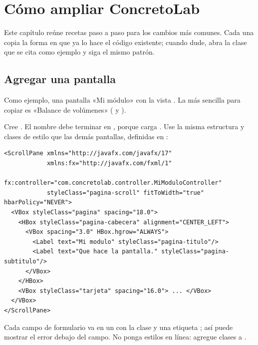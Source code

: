 \section{Cómo ampliar ConcretoLab}
\label{sec:amp-ampliar}

Este capítulo reúne recetas paso a paso para los cambios más comunes. Cada una copia la forma en que ya lo hace el
código existente; cuando dude, abra la clase que se cita como ejemplo y siga el mismo patrón.

\subsection{Agregar una pantalla}
\label{sec:amp-pantalla}

Como ejemplo, una pantalla «Mi módulo» con la vista . La más sencilla para copiar es
«Balance de volúmenes» ( y ).

\par\medskip\noindent{}\hspace{0.5em}{\bfseries Crear la vista FXML}\par\nopagebreak\smallskip

Cree . El nombre debe terminar en , porque
 carga . Use la misma estructura y clases de estilo que las demás
pantallas, definidas en :

\begin{verbatim}
<ScrollPane xmlns="http://javafx.com/javafx/17"
            xmlns:fx="http://javafx.com/fxml/1"
            fx:controller="com.concretolab.controller.MiModuloController"
            styleClass="pagina-scroll" fitToWidth="true" hbarPolicy="NEVER">
  <VBox styleClass="pagina" spacing="18.0">
    <HBox styleClass="pagina-cabecera" alignment="CENTER_LEFT">
      <VBox spacing="3.0" HBox.hgrow="ALWAYS">
        <Label text="Mi modulo" styleClass="pagina-titulo"/>
        <Label text="Que hace la pantalla." styleClass="pagina-subtitulo"/>
      </VBox>
    </HBox>
    <VBox styleClass="tarjeta" spacing="16.0"> ... </VBox>
  </VBox>
</ScrollPane>
\end{verbatim}

Cada campo de formulario va en un  con la clase  y una etiqueta ; así
 puede mostrar el error debajo del campo. No ponga estilos en línea:
agregue clases a .

